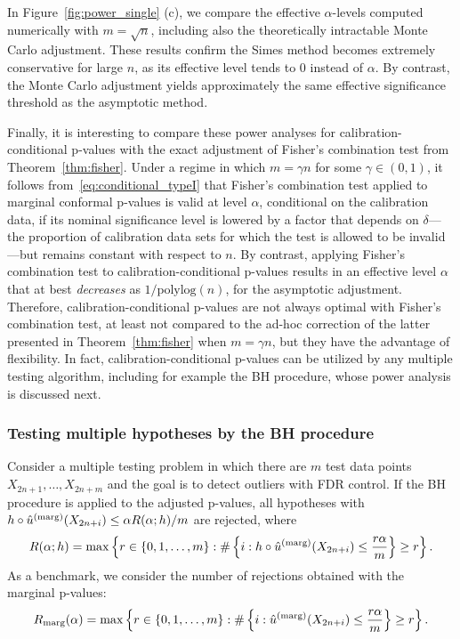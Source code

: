 \documentclass[11pt]{article}
\def\marg{\textnormal{(marg)}}
\begin{document}
In Figure~\ref{fig:power_single} (c), we compare the effective $\alpha$-levels computed numerically with $m = \sqrt{n}$, including also the theoretically intractable Monte Carlo adjustment. These results confirm the Simes method becomes extremely conservative for large $n$, as its effective level tends to $0$ instead of $\alpha$. By contrast, the Monte Carlo adjustment yields approximately the same effective significance threshold as the asymptotic method.

Finally, it is interesting to compare these power analyses for calibration-conditional p-values with the exact adjustment of Fisher's combination test from Theorem~\ref{thm:fisher}. 
Under a regime in which $m = \gamma n$ for some $\gamma \in (0, 1)$, it follows from~\eqref{eq:conditional_typeI} that Fisher's combination test applied to marginal conformal p-values is valid at level $\alpha$, conditional on the calibration data, if its nominal significance level is lowered by a factor that depends on $\delta$---the proportion of calibration data sets for which the test is allowed to be invalid---but remains constant with respect to $n$. By contrast, applying Fisher's combination test to calibration-conditional p-values results in an effective level $\alpha$ that at best {\em decreases} as $1/\text{polylog}(n)$, for the asymptotic adjustment.
Therefore, calibration-conditional p-values are not always optimal with Fisher's combination test, at least not compared to the ad-hoc correction of the latter presented in Theorem~\ref{thm:fisher} when $m = \gamma n$, but they have the advantage of flexibility. In fact, calibration-conditional p-values can be utilized by any multiple testing algorithm, including for example the BH procedure, whose power analysis is discussed next.

\subsubsection{Testing multiple hypotheses by the BH procedure} \label{sec:power-BH}

Consider a multiple testing problem in which there are $m$ test data points $X_{2n+1}, \ldots, X_{2n+m}$ and the goal is to detect outliers with FDR control. If the BH procedure is applied to the adjusted p-values, all hypotheses with $h\circ \hat{u}^\marg(X_{2n+i})\le \alpha R(\alpha; h) / m$ are rejected, where
\[R(\alpha; h) = \max\left\{r \in \{0,1,\ldots,m\}: \#\left\{i: h\circ \hat{u}^\marg(X_{2n+i})\le \frac{r\alpha}{m}\right\}\ge r\right\}.\]
As a benchmark, we consider the number of rejections obtained with the marginal p-values:
\[R_{\mathrm{marg}}(\alpha) = \max\left\{r \in \{0,1,\ldots,m\}: \#\left\{i: \hat{u}^\marg(X_{2n+i})\le \frac{r\alpha}{m}\right\}\ge r\right\}.\]
\end{document}
